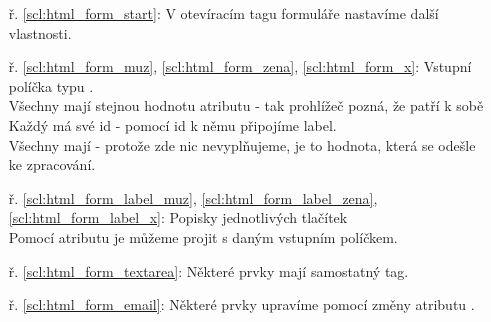 \begin{minipage}[t]{.45\textwidth}
\begin{enumerate}
\vspace{9cm}
\item[ř. \ref{scl:html_form_start}:] V otevíracím tagu formuláře nastavíme další vlastnosti. 
\item[ř. \ref{scl:html_form_muz}, \ref{scl:html_form_zena}, \ref{scl:html_form_x}:] Vstupní políčka typu .\\Všechny mají stejnou hodnotu atributu  - tak prohlížeč pozná, že patří k sobě\\
Každý má své id - pomocí id k němu připojíme label.\\
Všechny mají  - protože zde nic nevyplňujeme, je to hodnota, která se odešle ke zpracování.
\item[ř. \ref{scl:html_form_label_muz}, \ref{scl:html_form_label_zena}, \ref{scl:html_form_label_x}:] Popisky jednotlivých tlačítek\\
Pomocí atributu  je můžeme projit s daným vstupním políčkem.
\item[ř. \ref{scl:html_form_textarea}:] Některé prvky mají samostatný tag.
\item[ř. \ref{scl:html_form_email}:] Některé prvky upravíme pomocí změny atributu .
\end{enumerate}
\end{minipage}\\







